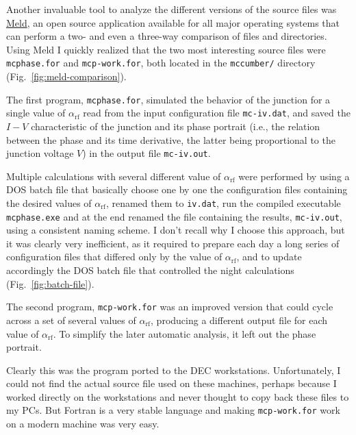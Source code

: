 Another invaluable tool to analyze the different versions of the source files was \href{http://meldmerge.org/}{Meld}, an open source application available for all major operating systems that can perform a two- and even a three-way comparison of files and directories.
Using Meld I quickly realized that the two most interesting source files were \texttt{mcphase.for} and \texttt{mcp-work.for}, both located in the \texttt{mccumber/} directory  (Fig.~\ref{fig:meld-comparison}).

The first program, \texttt{mcphase.for}, simulated the behavior of the junction for a single value of $\alpha_\mathrm{rf}$ read from the input configuration file \texttt{mc-iv.dat}, and saved the $I - V$ characteristic of the junction and its phase portrait (i.e., the relation between the phase and its time derivative, the latter being proportional to the junction voltage $V$) in the output file \texttt{mc-iv.out}.

Multiple calculations with several different value of $\alpha_\mathrm{rf}$ were performed by using a  DOS batch file that basically choose one by one the configuration files containing the desired values of $\alpha_\mathrm{rf}$, renamed them to \texttt{iv.dat}, run the compiled executable \texttt{mcphase.exe} and at the end renamed the file containing the results, \texttt{mc-iv.out}, using a consistent naming scheme.
I don't recall why I choose this approach, but it was clearly very inefficient, as it required to prepare each day a long series of configuration files that differed only by the value of $\alpha_\mathrm{rf}$, and to update accordingly the DOS batch file that controlled the night calculations (Fig.~\ref{fig:batch-file}).

The second program, \texttt{mcp-work.for} was an improved version that could cycle across a  set of several values of $\alpha_\mathrm{rf}$, producing a different output file for each value of $\alpha_\mathrm{rf}$. To simplify the later automatic analysis, it left out the phase portrait.

Clearly this was the program ported to the DEC workstations. 
Unfortunately, I could not find the actual source file used on these machines, perhaps because I worked directly on the workstations and never thought to copy back these files to my PCs.
But Fortran is a very stable language and making \texttt{mcp-work.for} work on a modern machine was very easy.

